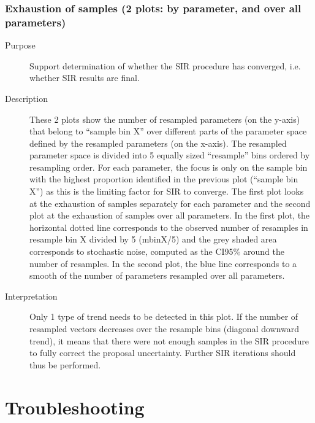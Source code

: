\subsubsection{Exhaustion of samples (2 plots: by parameter, and over all parameters)}
\begin{description}
\item[Purpose] Support determination of whether the SIR procedure has converged, i.e. whether SIR results are final.
\item[Description] These 2 plots show the number of resampled parameters (on the y-axis) that belong to “sample bin X” over different parts of the parameter space defined by the resampled parameters (on the x-axis). The resampled parameter space is divided into 5 equally sized “resample” bins ordered by resampling order. For each parameter, the focus is only on the sample bin with the highest proportion identified in the previous plot (“sample bin X”) as this is the limiting factor for SIR to converge. The first plot looks at the exhaustion of samples separately for each parameter and the second plot at the exhaustion of samples over all parameters. In the first plot, the horizontal dotted line corresponds to the observed number of resamples in resample bin X divided by 5 (mbinX/5) and the grey shaded area corresponds to stochastic noise, computed as the CI95\% around the number of resamples. In the second plot, the blue line corresponds to a smooth of the number of parameters resampled over all parameters.
\item[Interpretation] Only 1 type of trend needs to be detected in this plot. If the number of resampled vectors decreases over the resample bins (diagonal downward trend), it means that there were not enough samples in the SIR procedure to fully correct the proposal uncertainty. Further SIR iterations should thus be performed.
\end{description}

\section{Troubleshooting}
